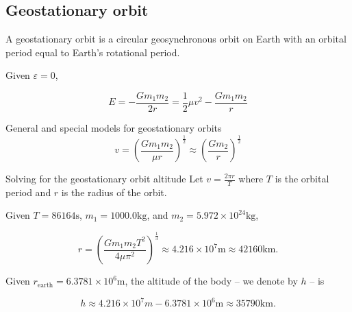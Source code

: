 \subsection{Geostationary orbit}

\begin{frame}{\subsecname}
A geostationary orbit is a circular geosynchronous orbit on Earth with an orbital period equal to Earth's rotational period.

Given \(\varepsilon = 0\),

\begin{equation}
E = -\frac{Gm_1m_2}{2r} = \frac{1}{2} \mu v^2 - \frac{Gm_1m_2}{r}
\end{equation}

\begin{block}{General and special models for geostationary orbits}
\begin{equation}
v = \left(\frac{Gm_1m_2}{\mu r} \right)^\frac{1}{2} \approx  \left(\frac{Gm_2}{r} \right)^\frac{1}{2}
\end{equation}
\end{block}
\end{frame}

\begin{frame}{Solving for the geostationary orbit altitude}
Let \(v = \frac{2\pi r}{T}\) where \(T\) is the orbital period and \(r\) is the radius of the orbit.

Given \(T = 86164 \text{s}\), \(m_1 = 1000.0 \text{kg}\), and \(m_2 =  5.972 \times 10^{24} \text{kg}\),

\begin{equation}
r = \left(\frac{Gm_1m_2T^2}{4\mu\pi^2}\right)^{\frac{1}{3}} \approx 4.216 \times 10^{7} \text{m} \approx 42160 \text{km}.
\end{equation}

Given \(r_\text{earth} = 6.3781 \times 10^{6} \text{m}\), the altitude of the body -- we denote by \(h\) -- is 

\begin{equation}
h \approx 4.216 \times 10^{7}m  - 6.3781 \times 10^{6} \text{m} \approx 35790 \text{km}.
\end{equation}

\end{frame}

\maketitle

